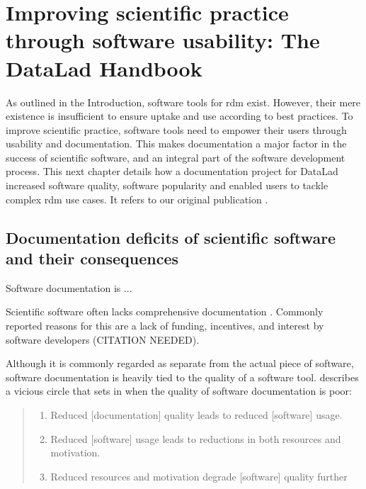 

\chapter{Improving scientific practice through software usability: The DataLad Handbook}
\label{chap:k2}

As outlined in the Introduction, software tools for \gls{rdm} exist.
However, their mere existence is insufficient to ensure uptake and use according to best practices.
To improve scientific practice, software tools need to empower their users through usability and documentation.
This makes documentation a major factor in the success of scientific software, and an integral part of the software development process.
This next chapter details how a documentation project for DataLad increased software quality, software popularity and enabled users to tackle complex \gls{rdm} use cases.
It refers to our original publication \citet{wagner2020datalad}.

\section{Documentation deficits of scientific software and their consequences}

Software documentation is ...

Scientific software often lacks comprehensive documentation \citet{segal2007some}.
Commonly reported reasons for this are a lack of funding, incentives, and interest by software developers (CITATION NEEDED).

Although it is commonly regarded as separate from the actual piece of software, software documentation is heavily tied to the quality of a software tool.
\citet{Parnas2011} describes a vicious circle that sets in when the quality of software documentation is poor:

\begin{quote}
\begin{enumerate}
\item Reduced [documentation] quality leads to reduced [software] usage.
\item Reduced [software] usage leads to reductions in both resources and motivation.
\item Reduced resources and motivation degrade [software] quality further
\end{enumerate}
\end{quote}


